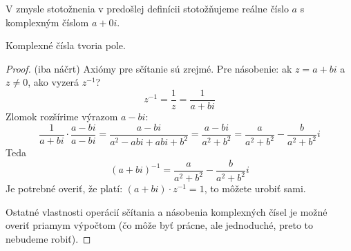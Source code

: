 V zmysle stotožnenia v predošlej definícii stotožňujeme reálne číslo $a$ s komplexným číslom $a+0i$.

\begin{veta}
Komplexné čísla tvoria pole.
\end{veta}
\begin{proof}
(iba náčrt) Axiómy pre sčítanie sú zrejmé. Pre násobenie: ak $z = a+bi$ a $z \neq 0$, ako vyzerá $z^{-1}$?
\[ z^{-1} = \frac{1}{z} = \frac{1}{a+bi} \]
Zlomok rozšírime výrazom $a-bi$:
\[ \frac{1}{a+bi} \cdot \frac{a-bi}{a-bi} = \frac{a-bi}{a^2 - abi + abi + b^2} = \frac{a-bi}{a^2+b^2} = \frac{a}{a^2+b^2} - \frac{b}{a^2+b^2}i \]
Teda
\[ (a+bi)^{-1} = \frac{a}{a^2+b^2} - \frac{b}{a^2+b^2}i \]
Je potrebné overiť, že platí: $(a+bi) \cdot z^{-1} = 1$, to môžete urobiť sami.

Ostatné vlastnosti operácií sčítania a násobenia komplexných čísel je možné overiť priamym výpočtom (čo môže byť prácne,
ale jednoduché, preto to nebudeme robiť).
\end{proof}

